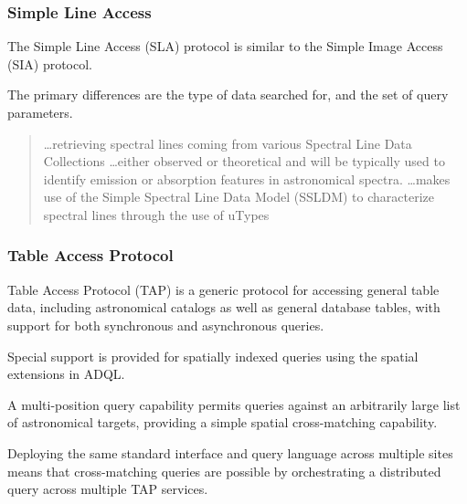 \documentclass{article}
\begin{document}
\subsubsection{Simple Line Access}

The Simple Line Access (SLA) protocol is similar to the Simple Image Access
(SIA) protocol.

The primary differences are the type of data searched for, and the set of query
parameters.

\begin{quote}
\ldots retrieving spectral lines coming from various Spectral Line Data
Collections
\ldots either observed or theoretical and will be typically used to identify
emission or absorption features in astronomical spectra.
\ldots makes use of the Simple Spectral Line Data Model
(SSLDM)  to characterize spectral
lines through the use of uTypes
\end{quote}
  
\subsubsection{Table Access Protocol}

Table Access Protocol (TAP) is a generic protocol for accessing general table
data, including astronomical catalogs as well as general database tables, with
support for both synchronous and asynchronous queries.

Special support is provided for spatially indexed queries using the spatial
extensions in ADQL.

A multi-position query capability permits queries against an arbitrarily large
list of astronomical targets, providing a simple spatial cross-matching
capability.

Deploying the same standard interface and query language across multiple sites
means that cross-matching queries are possible by orchestrating a distributed
query across multiple TAP services.

 
















\appendix
\end{document}
